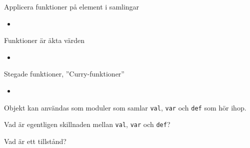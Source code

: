 \begin{Slide}{Applicera funktioner på element i samlingar}
\begin{itemize}
\item 
\end{itemize}
\end{Slide} 

\begin{Slide}{Funktioner är äkta värden}
\begin{itemize}
\item 
\end{itemize}
\end{Slide} 



\begin{Slide}{Stegade funktioner, ''Curry-funktioner''}
\begin{itemize}
\item 
\end{itemize}
\end{Slide} 





\begin{Slide}
Objekt kan användas som moduler som samlar \texttt{val}, \texttt{var} och \texttt{def} som hör ihop.
\end{Slide}

\begin{Slide}{Vad är egentligen skillnaden mellan \texttt{val}, \texttt{var} och \texttt{def}?} 
\end{Slide} 

\begin{Slide}{Vad är ett tillstånd?} 
\end{Slide} 






